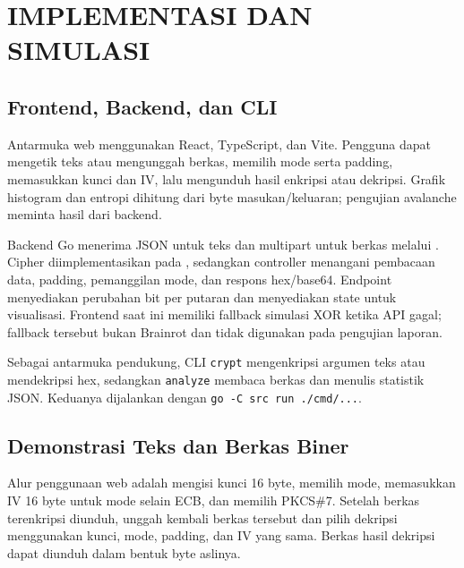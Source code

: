 \chapter{IMPLEMENTASI DAN SIMULASI}


\section{Frontend, Backend, dan CLI}
Antarmuka web menggunakan React, TypeScript, dan Vite. Pengguna dapat
mengetik teks atau mengunggah berkas, memilih mode serta padding,
memasukkan kunci dan IV, lalu mengunduh hasil enkripsi atau dekripsi.
Grafik histogram dan entropi dihitung dari byte masukan/keluaran;
pengujian avalanche meminta hasil dari backend.

Backend Go menerima JSON untuk teks dan multipart untuk berkas melalui
. Cipher diimplementasikan pada
, sedangkan controller menangani pembacaan data,
padding, pemanggilan mode, dan respons hex/base64. Endpoint
 menyediakan perubahan bit per putaran dan
 menyediakan state untuk visualisasi.
Frontend saat ini memiliki fallback simulasi XOR ketika API gagal;
fallback tersebut bukan Brainrot dan tidak digunakan pada pengujian laporan.

Sebagai antarmuka pendukung, CLI \texttt{crypt} mengenkripsi argumen teks
atau mendekripsi hex, sedangkan \texttt{analyze} membaca berkas dan menulis
statistik JSON. Keduanya dijalankan dengan \texttt{go -C src run ./cmd/...}.

\section{Demonstrasi Teks dan Berkas Biner}
Alur penggunaan web adalah mengisi kunci 16 byte, memilih mode, memasukkan
IV 16 byte untuk mode selain ECB, dan memilih PKCS\#7. Setelah berkas
terenkripsi diunduh, unggah kembali berkas tersebut dan pilih dekripsi
menggunakan kunci, mode, padding, dan IV yang sama. Berkas hasil dekripsi
dapat diunduh dalam bentuk byte aslinya.

